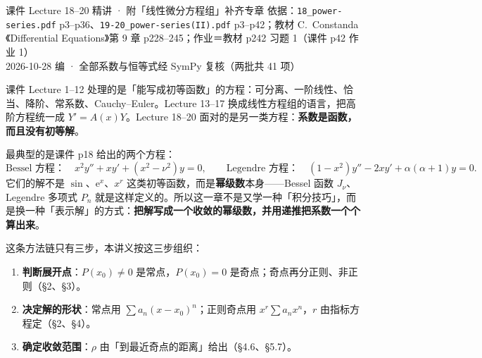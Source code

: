 \documentclass[11pt]{ctexart}
\let\orighdr\hdr
\renewcommand{\hdr}[2]{\needspace{6\baselineskip}\orighdr{#1}{#2}}
\let\origsubhdr\subhdr
\renewcommand{\subhdr}[1]{\needspace{3\baselineskip}\origsubhdr{#1}}
\newcommand{\ee}{\mathrm{e}}
\begin{document}
{课件 Lecture 18--20 精讲 · 附「线性微分方程组」补齐专章}
{依据：\texttt{18\_power-series.pdf} p3--p36、\texttt{19-20\_power-series(II).pdf} p3--p42；教材 C.~Constanda《Differential Equations》第 9 章 p228--245；作业＝教材 p242 习题 1（课件 p42 作业 1）\\ 2026-10-28 编 · 全部系数与恒等式经 SymPy 复核（两批共 41 项）}




课件 Lecture 1--12 处理的是「能写成初等函数」的方程：可分离、一阶线性、恰当、降阶、常系数、Cauchy--Euler。Lecture 13--17 换成线性方程组的语言，把高阶方程统一成 $Y'=A(x)Y$。Lecture 18--20 面对的是另一类方程：\textbf{系数是函数，而且没有初等解}。

最典型的是课件 p18 给出的两个方程：
\[
\text{Bessel 方程：}\quad x^2y''+xy'+(x^2-\nu^2)y=0,
\qquad
\text{Legendre 方程：}\quad (1-x^2)y''-2xy'+\alpha(\alpha+1)y=0 .
\]
它们的解不是 $\sin$、$\ee^x$、$x^r$ 这类初等函数，而是\textbf{幂级数}本身——Bessel 函数 $J_\nu$、Legendre 多项式 $P_n$ 就是这样定义的。所以这一章不是又学一种「积分技巧」，而是换一种「表示解」的方式：\textbf{把解写成一个收敛的幂级数，并用递推把系数一个个算出来}。

这条方法链只有三步，本讲义按这三步组织：
\begin{enumerate}
  \item \textbf{判断展开点}：$P(x_0)\neq0$ 是常点，$P(x_0)=0$ 是奇点；奇点再分正则、非正则（§2、§3）。
  \item \textbf{决定解的形状}：常点用 $\sum a_n(x-x_0)^n$；正则奇点用 $x^r\sum a_nx^n$，$r$ 由指标方程定（§2、§4）。
  \item \textbf{确定收敛范围}：$\rho$ 由「到最近奇点的距离」给出（§4.6、§5.7）。
\end{enumerate}
\end{document}
